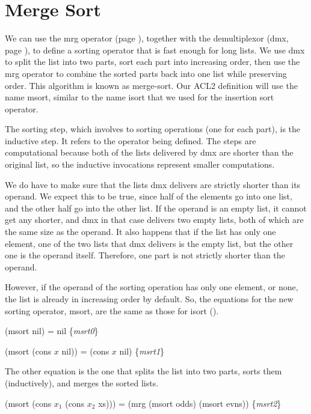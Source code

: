 \section{Merge Sort}
\label{sec:msort}

We can use the mrg operator (page \pageref{defun:mrg}),
together with the demultiplexor (dmx, page \pageref{defun:dmx}),
to define a sorting operator that is fast enough for long lists.
We use dmx to split the list into two parts,
sort each part into increasing order, then use the mrg operator to
combine the sorted parts back into one list while preserving order.
This algorithm is known as merge-sort. Our ACL2 definition
will use the name msort, similar to the name isort that we used
for the insertion sort operator.

The sorting step, which involves to sorting operations (one for each part),
is the inductive step. It refers to the operator being defined.
The steps are computational because both of the lists delivered by dmx
are shorter than the original list, so the inductive invocations
represent smaller computations.

We do have to make sure that the lists dmx delivers are strictly
shorter than its operand. We expect this to be true, since half
of the elements go into one list, and the other half go into the other list.
If the operand is an empty list, it cannot get any shorter,
and dmx in that case delivers two empty lists,
both of which are the same size as the operand.
It also happens that if the list has only one element,
one of the two lists that dmx delivers is the empty list,
but the other one is the operand itself. Therefore,
one part is not strictly shorter than the operand.

However, if the operand of the sorting operation has
only one element, or none, the list is already in increasing order
by default. So, the equations for the new sorting operator, msort,
are the same as those for isort (\pageref{eq:isrt0}).

\label{eq:msrt0}
\hspace{1cm} (msort nil) = nil \hfill \{\emph{msrt0}\}

\label{eq:msrt1}
\hspace{1cm} (msort (cons $x$ nil)) = (cons $x$ nil) \hfill \{\emph{msrt1}\}

The other equation is the one that splits the list into two parts,
sorts them (inductively), and merges the sorted lists.

\label{eq:msrt2}
\hspace{1cm} (msort (cons $x_1$ (cons $x_2$ xs))) = (mrg (msort odds) (msort evns)) \hfill \{\emph{msrt2}\}

